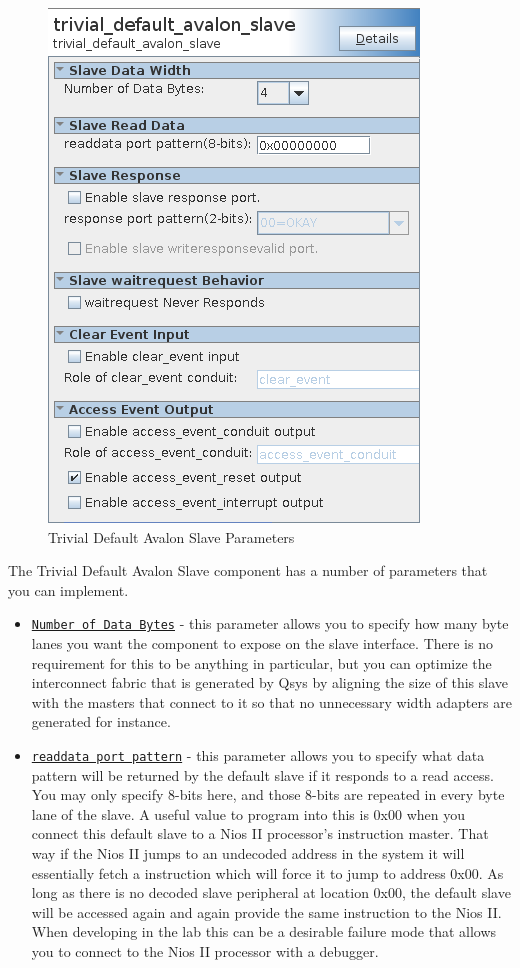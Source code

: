 \documentclass{article}
\begin{document}
\begin{flushleft}
\begin{figure}[H]
\centering
\includegraphics[scale=0.675]{tdas_parameters}
\caption{Trivial Default Avalon Slave Parameters}
\label{fig:tdas_parameters}
\end{figure}

The Trivial Default Avalon Slave component has a number of parameters that you can implement.
\begin{itemize}

\item \texttt{\underline{Number of Data Bytes}} - this parameter allows you to specify how many byte lanes you want the component to expose on the slave interface.  There is no requirement for this to be anything in particular, but you can optimize the interconnect fabric that is generated by Qsys by aligning the size of this slave with the masters that connect to it so that no unnecessary width adapters are generated for instance.

\item \texttt{\underline{readdata port pattern}} - this parameter allows you to specify what data pattern will be returned by the default slave if it responds to a read access.  You may only specify 8-bits here, and those 8-bits are repeated in every byte lane of the slave.  A useful value to program into this is 0x00 when you connect this default slave to a Nios II processor's instruction master.  That way if the Nios II jumps to an undecoded address in the system it will essentially fetch a  instruction which will force it to jump to address 0x00.  As long as there is no decoded slave peripheral at location 0x00, the default slave will be accessed again and again provide the same instruction to the Nios II.  When developing in the lab this can be a desirable failure mode that allows you to connect to the Nios II processor with a debugger.


\end{itemize}
\end{flushleft}
\end{document}
